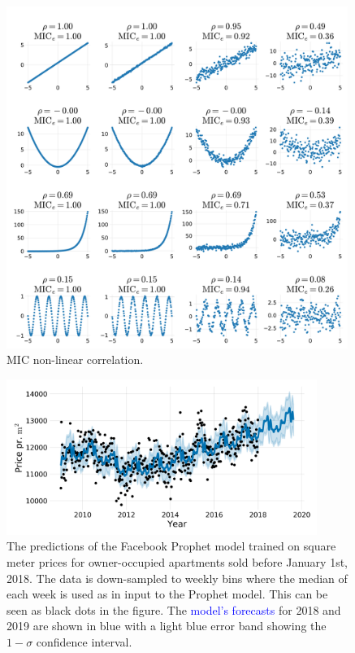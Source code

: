 \documentclass[a4paper, twoside, nobib]{tufte-book}
\begin{document}
\begin{figure}[h!]
  \centering
  \includegraphics[draft, width=0.99\textwidth, trim=0 0 0 40, clip]{figures/housing/MIC_test.pdf}
  \caption[MIC non-linear correlation]
          {MIC non-linear correlation.}
  \label{fig:h:MIC_example}
\end{figure}



\begin{figure}[h!]
  \includegraphics[draft, width=0.9\textwidth]{figures/housing/Villa_v18_cut_all_Ncols_all_prophet_forecast.png}
  \caption[Prophet Forecast for apartments]
          {The predictions of the Facebook Prophet model trained on square meter prices for owner-occupied apartments sold before January 1st, 2018. The data is down-sampled to weekly bins where the median of each week is used as in input to the Prophet model. This can be seen as black dots in the figure. The \textcolor{blue}{model's forecasts} for 2018 and 2019 are shown in blue with a light blue \textcolor{light-blue}{error band} showing the $1-\sigma$ confidence interval.
          }
  \label{fig:h:prophet_forecast_villa}
\end{figure}
\end{document}
